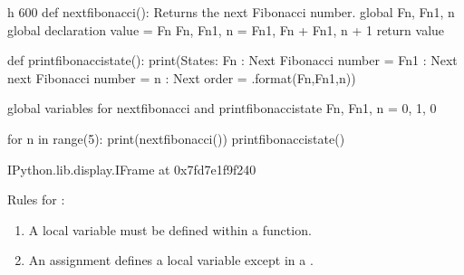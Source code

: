 \documentclass[letterpaper,10pt,english]{sphinxmanual}
\begin{document}
\begin{sphinxVerbatim}[commandchars=\\\{\}]
 \PYGZhy{}h 600
def next\PYGZus{}fibonacci():
    \PYGZsq{}\PYGZsq{}\PYGZsq{}Returns the next Fibonacci number.\PYGZsq{}\PYGZsq{}\PYGZsq{}
    global \PYGZus{}Fn, \PYGZus{}Fn1, \PYGZus{}n  \PYGZsh{} global declaration
    value = \PYGZus{}Fn
    \PYGZus{}Fn, \PYGZus{}Fn1, \PYGZus{}n = \PYGZus{}Fn1, \PYGZus{}Fn + \PYGZus{}Fn1, \PYGZus{}n + 1
    return value

def print\PYGZus{}fibonacci\PYGZus{}state():
    print(\PYGZsq{}\PYGZsq{}\PYGZsq{}States:
    \PYGZus{}Fn  : Next Fibonacci number      = \PYGZob{}\PYGZcb{}
    \PYGZus{}Fn1 : Next next Fibonacci number = \PYGZob{}\PYGZcb{}
    \PYGZus{}n   : Next order                 = \PYGZob{}\PYGZcb{}\PYGZsq{}\PYGZsq{}\PYGZsq{}.format(\PYGZus{}Fn,\PYGZus{}Fn1,\PYGZus{}n))

\PYGZsh{} global variables for next\PYGZus{}fibonacci and print\PYGZus{}fibonacci\PYGZus{}state
\PYGZus{}Fn, \PYGZus{}Fn1, \PYGZus{}n = 0, 1, 0

for n in range(5):
    print(next\PYGZus{}fibonacci())
print\PYGZus{}fibonacci\PYGZus{}state()
\end{sphinxVerbatim}

\begin{sphinxVerbatim}[commandchars=\\\{\}]
\PYGZlt{}IPython.lib.display.IFrame at 0x7fd7e1f9f240\PYGZgt{}
\end{sphinxVerbatim}

Rules for :
\begin{enumerate}
%
\item {} 
A local variable must be defined within a function.

\item {} 
An assignment defines a local variable except in a .

\end{enumerate}

\end{document}
